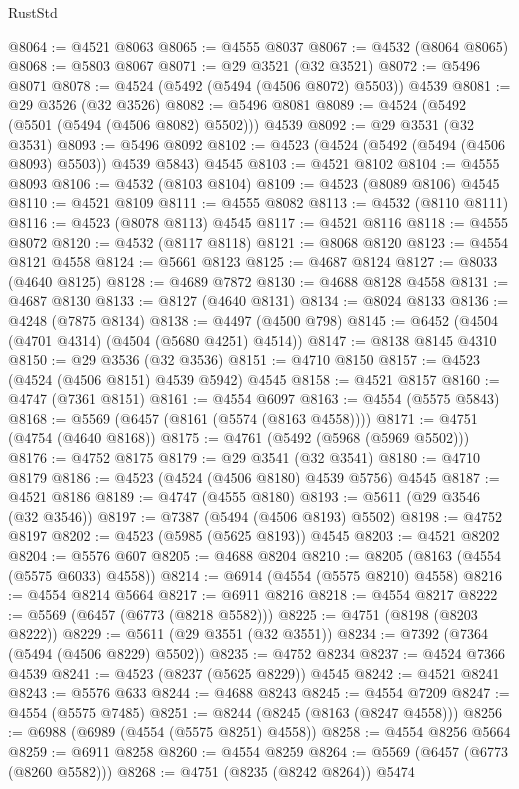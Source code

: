 \begin{lexlean}{RustStd}
\begin{coremodule}
@8064 := @4521 @8063
@8065 := @4555 @8037
@8067 := @4532 (@8064 @8065)
@8068 := @5803 @8067
@8071 := @29 @3521 (@32 @3521)
@8072 := @5496 @8071
@8078 := @4524 (@5492 (@5494 (@4506 @8072) @5503)) @4539
@8081 := @29 @3526 (@32 @3526)
@8082 := @5496 @8081
@8089 := @4524 (@5492 (@5501 (@5494 (@4506 @8082) @5502))) @4539
@8092 := @29 @3531 (@32 @3531)
@8093 := @5496 @8092
@8102 := @4523 (@4524 (@5492 (@5494 (@4506 @8093) @5503)) @4539 @5843) @4545
@8103 := @4521 @8102
@8104 := @4555 @8093
@8106 := @4532 (@8103 @8104)
@8109 := @4523 (@8089 @8106) @4545
@8110 := @4521 @8109
@8111 := @4555 @8082
@8113 := @4532 (@8110 @8111)
@8116 := @4523 (@8078 @8113) @4545
@8117 := @4521 @8116
@8118 := @4555 @8072
@8120 := @4532 (@8117 @8118)
@8121 := @8068 @8120
@8123 := @4554 @8121 @4558
@8124 := @5661 @8123
@8125 := @4687 @8124
@8127 := @8033 (@4640 @8125)
@8128 := @4689 @7872
@8130 := @4688 @8128 @4558
@8131 := @4687 @8130
@8133 := @8127 (@4640 @8131)
@8134 := @8024 @8133
@8136 := @4248 (@7875 @8134)
@8138 := @4497 (@4500 @798)
@8145 := @6452 (@4504 (@4701 @4314) (@4504 (@5680 @4251) @4514))
@8147 := @8138 @8145 @4310
@8150 := @29 @3536 (@32 @3536)
@8151 := @4710 @8150
@8157 := @4523 (@4524 (@4506 @8151) @4539 @5942) @4545
@8158 := @4521 @8157
@8160 := @4747 (@7361 @8151)
@8161 := @4554 @6097
@8163 := @4554 (@5575 @5843)
@8168 := @5569 (@6457 (@8161 (@5574 (@8163 @4558))))
@8171 := @4751 (@4754 (@4640 @8168))
@8175 := @4761 (@5492 (@5968 (@5969 @5502)))
@8176 := @4752 @8175
@8179 := @29 @3541 (@32 @3541)
@8180 := @4710 @8179
@8186 := @4523 (@4524 (@4506 @8180) @4539 @5756) @4545
@8187 := @4521 @8186
@8189 := @4747 (@4555 @8180)
@8193 := @5611 (@29 @3546 (@32 @3546))
@8197 := @7387 (@5494 (@4506 @8193) @5502)
@8198 := @4752 @8197
@8202 := @4523 (@5985 (@5625 @8193)) @4545
@8203 := @4521 @8202
@8204 := @5576 @607
@8205 := @4688 @8204
@8210 := @8205 (@8163 (@4554 (@5575 @6033) @4558))
@8214 := @6914 (@4554 (@5575 @8210) @4558)
@8216 := @4554 @8214 @5664
@8217 := @6911 @8216
@8218 := @4554 @8217
@8222 := @5569 (@6457 (@6773 (@8218 @5582)))
@8225 := @4751 (@8198 (@8203 @8222))
@8229 := @5611 (@29 @3551 (@32 @3551))
@8234 := @7392 (@7364 (@5494 (@4506 @8229) @5502))
@8235 := @4752 @8234
@8237 := @4524 @7366 @4539
@8241 := @4523 (@8237 (@5625 @8229)) @4545
@8242 := @4521 @8241
@8243 := @5576 @633
@8244 := @4688 @8243
@8245 := @4554 @7209
@8247 := @4554 (@5575 @7485)
@8251 := @8244 (@8245 (@8163 (@8247 @4558)))
@8256 := @6988 (@6989 (@4554 (@5575 @8251) @4558))
@8258 := @4554 @8256 @5664
@8259 := @6911 @8258
@8260 := @4554 @8259
@8264 := @5569 (@6457 (@6773 (@8260 @5582)))
@8268 := @4751 (@8235 (@8242 @8264)) @5474

\end{coremodule}
\end{lexlean}
